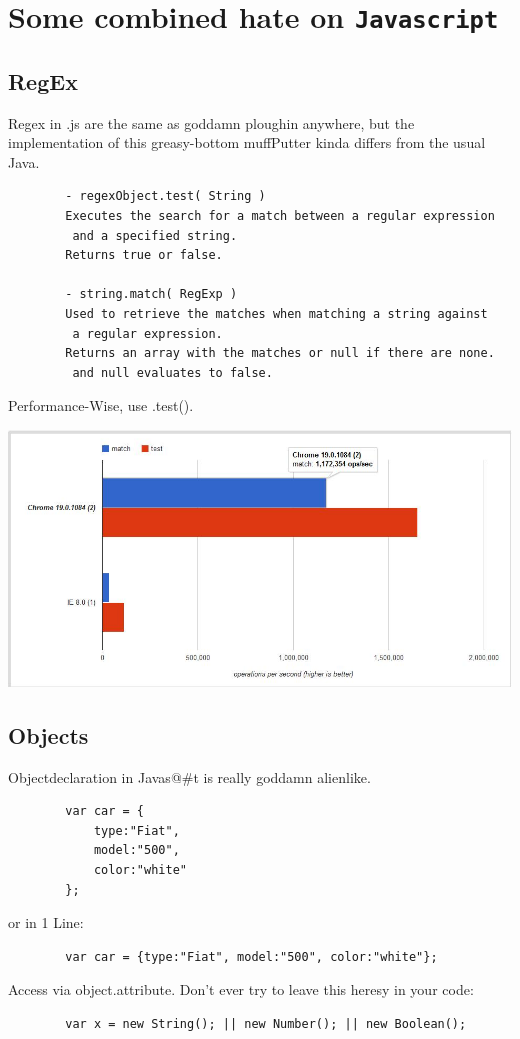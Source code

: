 \documentclass[11pt]{article}
\begin{document}
    \section{Some combined hate on \texttt{Javascript}}

    \subsection{RegEx}
    Regex in .js are the same as goddamn ploughin anywhere, but the implementation of
    this greasy-bottom muffPutter kinda differs from the usual Java.

    \begin{verbatim}
        - regexObject.test( String )
        Executes the search for a match between a regular expression
         and a specified string.
        Returns true or false.

        - string.match( RegExp )
        Used to retrieve the matches when matching a string against
         a regular expression.
        Returns an array with the matches or null if there are none.
         and null evaluates to false.
    \end{verbatim}

    Performance-Wise, use .test().\\
    \begin{center}
        \includegraphics[width=\textwidth]{jsRegex.jpg}
    \end{center}

    \subsection{Objects}
    Objectdeclaration in Javas@\#t is really goddamn alienlike.
    \begin{verbatim}
        var car = {
            type:"Fiat",
            model:"500",
            color:"white"
        };
    \end{verbatim}
    or in 1 Line:
    \begin{verbatim}
        var car = {type:"Fiat", model:"500", color:"white"};
    \end{verbatim}
    Access via object.attribute.
    Don't ever try to leave this heresy in your code:
    \begin{verbatim}
        var x = new String(); || new Number(); || new Boolean();
    \end{verbatim}
\end{document}
